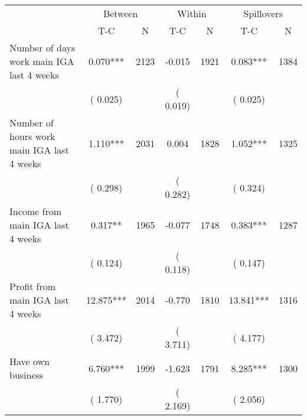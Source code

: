 \documentclass[10pt,a4paper]{article}
\begin{document}
	
\begin{table}
\begin{tabular}{l*{6}{c}}\hline&\multicolumn{2}{c}{Between}&\multicolumn{2}{c}{Within}&\multicolumn{2}{c}{Spillovers} \\ \cmidrule(r){2-3}\cmidrule(l){4-5}\cmidrule(l){6-7} & {T-C} & {N} & {T-C} & {N}  & {T-C}  & {N}  \\ \midrule
Number of days work main IGA last 4 weeks        &              0.070***      &       2123       &             -0.015      &       1921       &              0.083***      &       1384       \\
                       &       (       0.025)            &                               &       (       0.019)            &                               &       (       0.025)            &                               \\
Number of hours work main IGA last 4 weeks        &              1.110***      &       2031       &              0.004      &       1828       &              1.052***      &       1325       \\
                       &       (       0.298)            &                               &       (       0.282)            &                               &       (       0.324)            &                               \\
Income from main IGA last 4 weeks        &              0.317**      &       1965       &             -0.077      &       1748       &              0.383***      &       1287       \\
                       &       (       0.124)            &                               &       (       0.118)            &                               &       (       0.147)            &                               \\
Profit from main IGA last 4 weeks        &             12.875***      &       2014       &             -0.770      &       1810       &             13.841***      &       1316       \\
                       &       (       3.472)            &                               &       (       3.711)            &                               &       (       4.177)            &                               \\
Have own business        &              6.760***      &       1999       &             -1.623      &       1791       &              8.285***      &       1300       \\
                       &       (       1.770)            &                               &       (       2.169)            &                               &       (       2.056)            &                               \\

\end{tabular}
\end{table}
\end{document}
